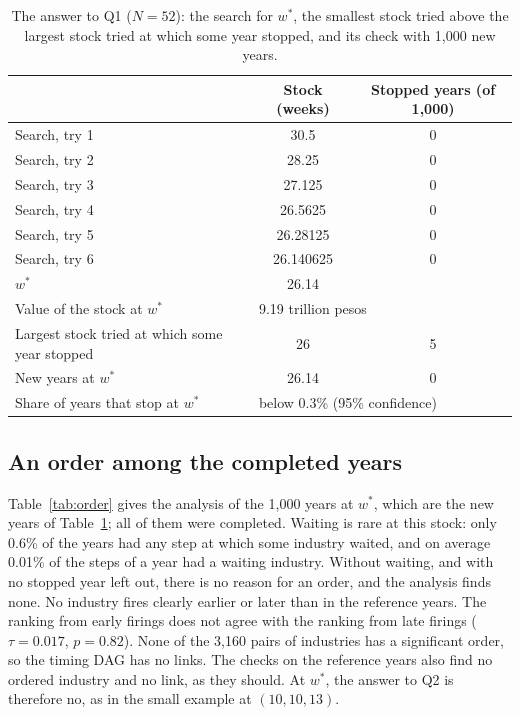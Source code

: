 \documentclass[11pt]{article}
\begin{document}
\begin{table}[htbp]
\centering\small
\caption{The answer to Q1 ($N=52$): the search for $w^*$, the smallest stock tried above the largest stock tried at which some year stopped, and its check with 1{,}000 new years.}
\label{tab:minstock}
\begin{tabular}{@{}lcc@{}}
\toprule
& Stock (weeks) & Stopped years (of 1{,}000)\\
\midrule
Search, try 1 & 30.5 & 0\\
Search, try 2 & 28.25 & 0\\
Search, try 3 & 27.125 & 0\\
Search, try 4 & 26.5625 & 0\\
Search, try 5 & 26.28125 & 0\\
Search, try 6 & 26.140625 & 0\\
\midrule
$w^*$ & 26.14 & \\
Value of the stock at $w^*$ & \multicolumn{2}{l}{9.19 trillion pesos}\\
Largest stock tried at which some year stopped & 26 & 5\\
New years at $w^*$ & 26.14 & 0\\
Share of years that stop at $w^*$ & \multicolumn{2}{l}{below 0.3\% (95\% confidence)}\\
\bottomrule
\end{tabular}
\end{table}

\subsection{An order among the completed years}

Table~\ref{tab:order} gives the analysis of the 1{,}000 years at $w^*$, which are the new years of Table~\ref{tab:minstock}; all of them were completed. Waiting is rare at this stock: only 0.6\% of the years had any step at which some industry waited, and on average 0.01\% of the steps of a year had a waiting industry. Without waiting, and with no stopped year left out, there is no reason for an order, and the analysis finds none. No industry fires clearly earlier or later than in the reference years. The ranking from early firings does not agree with the ranking from late firings ($\tau=0.017$, $p=0.82$). None of the 3{,}160 pairs of industries has a significant order, so the timing DAG has no links. The checks on the reference years also find no ordered industry and no link, as they should. At $w^*$, the answer to Q2 is therefore no, as in the small example at $(10,10,13)$.
\end{document}
